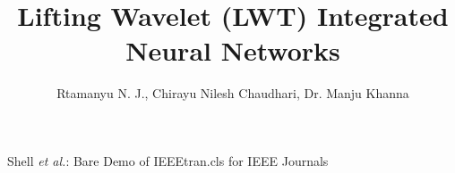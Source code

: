 \documentclass[journal]{IEEEtran}
\begin{document}
%
\title{Lifting Wavelet (LWT) Integrated Neural Networks}
%
%
%

\author{Rtamanyu N. J.,
        Chirayu Nilesh Chaudhari, Dr. Manju Khanna }

% 
%



%
{Shell \MakeLowercase{\textit{et al.}}: Bare Demo of IEEEtran.cls for IEEE Journals}
% 
\end{document}
